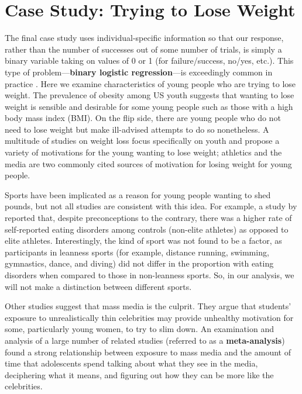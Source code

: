 \documentclass[
]{krantz}
\begin{document}
\hypertarget{case-study-trying-to-lose-weight}{%
\section{Case Study: Trying to Lose Weight}\label{case-study-trying-to-lose-weight}}

The final case study uses individual-specific information so that our response, rather than the number of successes out of some number of trials, is simply a binary variable taking on values of 0 or 1 (for failure/success, no/yes, etc.). This type of problem---\textbf{binary logistic regression}---is exceedingly common in practice . Here we examine characteristics of young people who are trying to lose weight. The prevalence of obesity among US youth suggests that wanting to lose weight is sensible and desirable for some young people such as those with a high body mass index (BMI). On the flip side, there are young people who do not need to lose weight but make ill-advised attempts to do so nonetheless. A multitude of studies on weight loss focus specifically on youth and propose a variety of motivations for the young wanting to lose weight; athletics and the media are two commonly cited sources of motivation for losing weight for young people.

Sports have been implicated as a reason for young people wanting to shed pounds, but not all studies are consistent with this idea. For example, a study by \citet{Martinsen2009} reported that, despite preconceptions to the contrary, there was a higher rate of self-reported eating disorders among controls (non-elite athletes) as opposed to elite athletes. Interestingly, the kind of sport was not found to be a factor, as participants in leanness sports (for example, distance running, swimming, gymnastics, dance, and diving) did not differ in the proportion with eating disorders when compared to those in non-leanness sports. So, in our analysis, we will not make a distinction between different sports.

Other studies suggest that mass media is the culprit. They argue that students' exposure to unrealistically thin celebrities may provide unhealthy motivation for some, particularly young women, to try to slim down. An examination and analysis of a large number of related studies (referred to as a \textbf{meta-analysis}) \citep{Grabe2008} found a strong relationship between exposure to mass media and the amount of time that adolescents spend talking about what they see in the media, deciphering what it means, and figuring out how they can be more like the celebrities.
\end{document}
